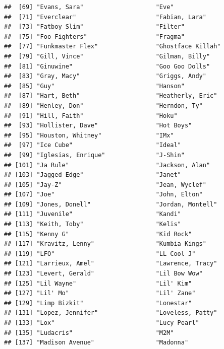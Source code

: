 \documentclass[
  11pt]{report}
\begin{document}
\begin{itemize}
\begin{verbatim}
##  [69] "Evans, Sara"                    "Eve"                           
##  [71] "Everclear"                      "Fabian, Lara"                  
##  [73] "Fatboy Slim"                    "Filter"                        
##  [75] "Foo Fighters"                   "Fragma"                        
##  [77] "Funkmaster Flex"                "Ghostface Killah"              
##  [79] "Gill, Vince"                    "Gilman, Billy"                 
##  [81] "Ginuwine"                       "Goo Goo Dolls"                 
##  [83] "Gray, Macy"                     "Griggs, Andy"                  
##  [85] "Guy"                            "Hanson"                        
##  [87] "Hart, Beth"                     "Heatherly, Eric"               
##  [89] "Henley, Don"                    "Herndon, Ty"                   
##  [91] "Hill, Faith"                    "Hoku"                          
##  [93] "Hollister, Dave"                "Hot Boys"                      
##  [95] "Houston, Whitney"               "IMx"                           
##  [97] "Ice Cube"                       "Ideal"                         
##  [99] "Iglesias, Enrique"              "J-Shin"                        
## [101] "Ja Rule"                        "Jackson, Alan"                 
## [103] "Jagged Edge"                    "Janet"                         
## [105] "Jay-Z"                          "Jean, Wyclef"                  
## [107] "Joe"                            "John, Elton"                   
## [109] "Jones, Donell"                  "Jordan, Montell"               
## [111] "Juvenile"                       "Kandi"                         
## [113] "Keith, Toby"                    "Kelis"                         
## [115] "Kenny G"                        "Kid Rock"                      
## [117] "Kravitz, Lenny"                 "Kumbia Kings"                  
## [119] "LFO"                            "LL Cool J"                     
## [121] "Larrieux, Amel"                 "Lawrence, Tracy"               
## [123] "Levert, Gerald"                 "Lil Bow Wow"                   
## [125] "Lil Wayne"                      "Lil' Kim"                      
## [127] "Lil' Mo"                        "Lil' Zane"                     
## [129] "Limp Bizkit"                    "Lonestar"                      
## [131] "Lopez, Jennifer"                "Loveless, Patty"               
## [133] "Lox"                            "Lucy Pearl"                    
## [135] "Ludacris"                       "M2M"                           
## [137] "Madison Avenue"                 "Madonna"                       

\end{verbatim}
\end{itemize}
\end{document}
